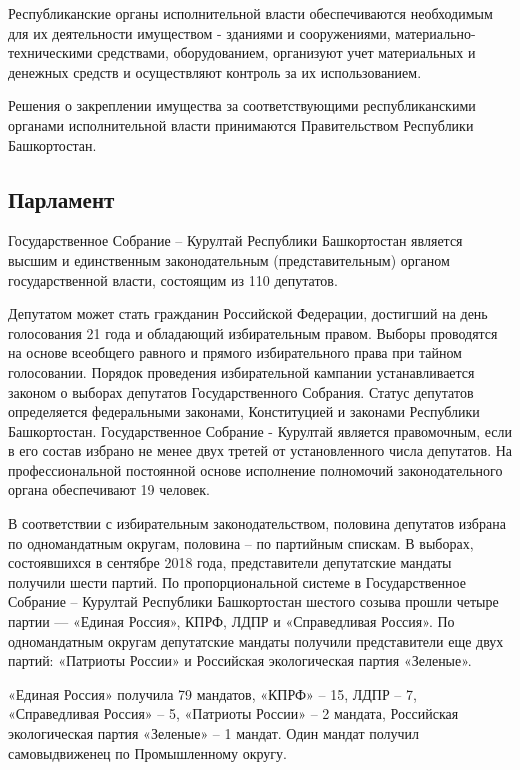 Республиканские  органы  исполнительной  власти обеспечиваются
необходимым   для   их   деятельности   имуществом   -  зданиями  и
сооружениями,  материально-техническими  средствами, оборудованием,
организуют  учет  материальных  и  денежных  средств и осуществляют
контроль за их использованием.

Решения    о   закреплении   имущества   за   соответствующими
республиканскими   органами   исполнительной   власти   принимаются
Правительством Республики Башкортостан.

\subsection{Парламент}

Государственное Собрание – Курултай Республики Башкортостан является высшим и единственным законодательным (представительным) органом государственной власти, состоящим из 110 депутатов.

Депутатом может стать гражданин Российской Федерации, достигший на день голосования 21 года и обладающий избирательным правом. Выборы проводятся на основе всеобщего равного и прямого избирательного права при тайном голосовании. Порядок проведения избирательной кампании устанавливается законом о выборах депутатов Государственного Собрания. Статус депутатов определяется федеральными законами, Конституцией и законами Республики Башкортостан. Государственное Собрание - Курултай является правомочным, если в его состав избрано не менее двух третей от установленного числа депутатов. На профессиональной постоянной основе исполнение полномочий законодательного органа обеспечивают 19 человек.

В соответствии с избирательным законодательством, половина депутатов избрана по одномандатным округам, половина – по партийным спискам. В выборах, состоявшихся в сентябре 2018 года, представители депутатские мандаты получили шести партий. По пропорциональной системе в Государственное Собрание – Курултай Республики Башкортостан шестого созыва прошли четыре партии — «Единая Россия», КПРФ, ЛДПР и «Справедливая Россия». По одномандатным округам депутатские мандаты получили представители еще двух партий: «Патриоты России» и Российская экологическая партия «Зеленые».

«Единая Россия» получила 79 мандатов, «КПРФ» – 15, ЛДПР – 7, «Справедливая Россия» – 5, «Патриоты России» – 2 мандата, Российская экологическая партия «Зеленые» – 1 мандат. Один мандат получил самовыдвиженец по Промышленному округу.

